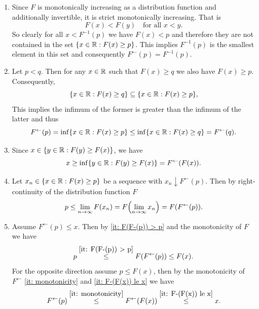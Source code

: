 \begin{solution}
\begin{enumerate}[wide=0pt]
    \item[\ref{it: quantile if invertible}]
    Since \(F\) is monotonically increasing as a distribution
    function and additionally invertible, it is strict monotonically
    increasing. That is
    \[
        F(x) < F(y) \quad \text{for all } x < y.
    \]
    So clearly for all \(x< F^{-1}(p)\) we have \(F(x) < p\) and
    therefore they are not contained in the set \(\{x\in \mathbb{R} : F(x)
    \ge p\}\). This implies \(F^{-1}(p)\) is the smallest element in this set
    and consequently \(F^{\leftarrow}(p) = F^{-1}(p)\).

    \item[\ref{it: monotonicity}]
    Let \(p < q\). Then for any \(x \in \mathbb{R}\) such that \(F(x) \ge q\)
    we also have \(F(x) \ge p\). Consequently,
    \[
        \{x \in \mathbb{R} : F(x) \ge q\} \subseteq \{x \in \mathbb{R} : F(x) \ge p\},
    \]
    This implies the infimum of the former is greater than the infimum of the latter
    and thus
    \[
        F^{\leftarrow}(p) = \inf\{x \in \mathbb{R} : F(x) \ge p\} \le \inf\{x \in \mathbb{R} : F(x) \ge q\} = F^{\leftarrow}(q).
    \]

    \item[\ref{it: F-(F(x)) le x}]
    Since \(x\in \{y\in \mathbb{R} : F(y) \ge F(x)\}\), we have
    \[
        x \ge \inf\{y\in \mathbb{R} : F(y) \ge F(x)\} = F^{\leftarrow}(F(x)).
    \]

    \item[\ref{it: F(F-(p)) > p}]
    Let \(x_n \in \{x\in \mathbb{R} : F(x) \ge p\}\) be a sequence with \(x_n \downarrow F^{\leftarrow}(p)\). Then
    by right-continuity of the distribution function \(F\)
    \[
        p \le \lim_{n\to \infty} F(x_n)
        = F\Bigl(\lim_{n\to \infty} x_n\Bigr)
        = F(F^{\leftarrow}(p)).
    \]
    
    \item[\ref{it: F-(p)< x iff p<F(x)}]
    Assume \(F^{\leftarrow}(p) \le x\). Then by \ref{it: F(F-(p)) > p} 
    and the monotonicity of \(F\) we have
    \[
        p \overset{\ref{it: F(F-(p)) > p}}\le F(F^{\leftarrow}(p)) \le F(x).
    \]
    For the opposite direction assume \(p\le F(x)\), then by the
    monotonicity of \(F^{\leftarrow}\) \ref{it: monotonicity}
    and \ref{it: F-(F(x)) le x} we have
    \[
        F^{\leftarrow}(p) \overset{\ref{it: monotonicity}}\le F^{\leftarrow}(F(x)) \overset{\ref{it: F-(F(x)) le x}}\le x.
    \]


\end{enumerate}
\end{solution}
